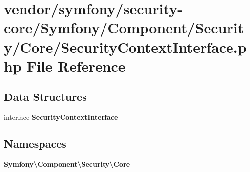 \section{vendor/symfony/security-\/core/\+Symfony/\+Component/\+Security/\+Core/\+Security\+Context\+Interface.php File Reference}
\label{_security_context_interface_8php}
\subsection*{Data Structures}
\begin{DoxyCompactItemize}
\item 
interface {\bf Security\+Context\+Interface}
\end{DoxyCompactItemize}
\subsection*{Namespaces}
\begin{DoxyCompactItemize}
\item 
 {\bf Symfony\textbackslash{}\+Component\textbackslash{}\+Security\textbackslash{}\+Core}
\end{DoxyCompactItemize}
